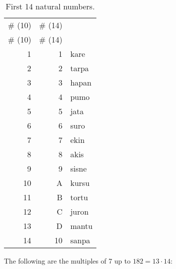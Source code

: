 \documentclass{book}
\begin{document}
\begin{longtabu}[c]{|r|r|X|}
    \caption{First 14 natural numbers.}
    \centering
    
    \\ \hline
    \# (10) & \# (14) & \\
    \hline
    \endfirsthead
    
    \hline
    \# (10) & \# (14) & \\
    \hline
    \endhead
    
    \hline
    \endfoot
    
    \hline
    \endlastfoot
    
    1 & 1 & kare \\
    2 & 2 & tarpa \\
    3 & 3 & hapan \\
    4 & 4 & pumo \\
    5 & 5 & jata \\
    6 & 6 & suro \\
    7 & 7 & ekin \\
    8 & 8 & akis \\
    9 & 9 & sisne \\
    10 & A & kursu \\
    11 & B & tortu \\
    12 & C & juron \\
    13 & D & mantu \\
    14 & 10 & sanpa \\
\end{longtabu}

The following are the multiples of 7 up to $182 = 13 \cdot 14$:
\end{document}
